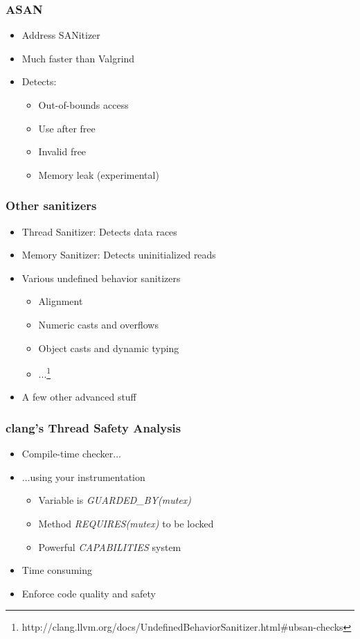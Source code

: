 \begin{frame}
  \frametitle{ASAN}

  \begin{itemize}
  \item Address SANitizer
  \item Much faster than Valgrind
  \item Detects:
    \begin{itemize}
    \item Out-of-bounds access
    \item Use after free
    \item Invalid free
    \item Memory leak (experimental)
    \end{itemize}
  \end{itemize}
\end{frame}

\begin{frame}
  \frametitle{Other sanitizers}

  \begin{itemize}
  \item Thread Sanitizer: Detects data races
  \item Memory Sanitizer: Detects uninitialized reads
  \item Various undefined behavior sanitizers
    \begin{itemize}
    \item Alignment
    \item Numeric casts and overflows
    \item Object casts and dynamic typing
    \item ...\footnote{http://clang.llvm.org/docs/UndefinedBehaviorSanitizer.html\#ubsan-checks}
    \end{itemize}
  \item A few other advanced stuff
  \end{itemize}
\end{frame}

\begin{frame}
  \frametitle{clang's Thread Safety Analysis}

  \begin{itemize}
  \item Compile-time checker...
  \item ...using your instrumentation
    \begin{itemize}
    \item Variable is \emph{GUARDED\_BY(mutex)}
    \item Method \emph{REQUIRES(mutex)} to be locked
    \item Powerful \emph{CAPABILITIES} system
    \end{itemize}
  \item Time consuming
  \item Enforce code quality and safety
  \end{itemize}
\end{frame}

